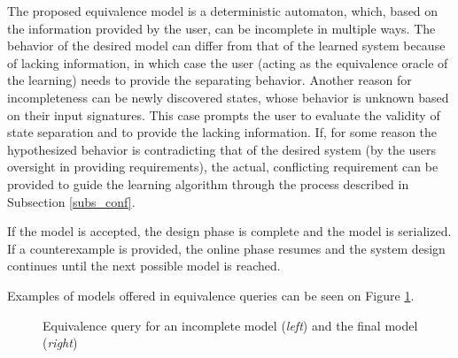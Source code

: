 The proposed equivalence model is a deterministic automaton, which, based on the information provided by the user, can be incomplete in multiple ways. The behavior of the desired model can differ from that of the learned system because of lacking information, in which case the user (acting as the equivalence oracle of the learning) needs to provide the separating behavior. Another reason for incompleteness can be newly discovered states, whose behavior is unknown based on their input signatures. This case prompts the user to evaluate the validity of state separation and to provide the lacking information. If, for some reason the hypothesized behavior is contradicting that of the desired system (by the users oversight in providing requirements), the actual, conflicting requirement can be provided to guide the learning algorithm through the process described in Subsection \ref{subs_conf}.

If the model is accepted, the design phase is complete and the model is serialized. If a counterexample is provided, the online phase resumes and the system design continues until the next possible model is reached.

Examples of models offered in equivalence queries can be seen on Figure \ref{fig_methodology_eqex}.

\begin{figure}[!ht] 
	\centering
	\caption{Equivalence query for an incomplete model (\textit{left}) and the final model (\textit{right})}
	\label{fig_methodology_eqex}
\end{figure}

